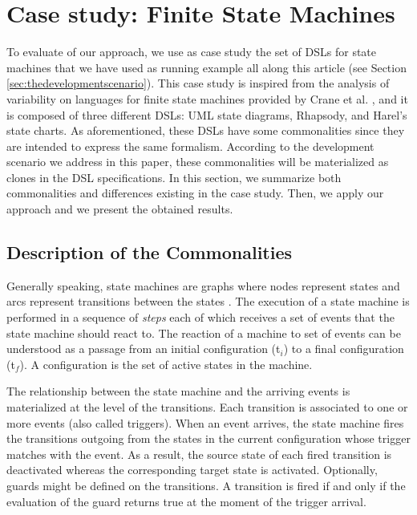 \section{Case study: Finite State Machines}
\label{sec:validation}

 To evaluate of our approach, we use as case study the set of DSLs for state machines that we have used as running example all along this article (see Section \ref{sec:thedevelopmentscenario}). This case study is inspired from the analysis of variability on languages for finite state machines provided by Crane et al. \cite{Crane:2007}, and it is composed of three different DSLs: UML state diagrams, Rhapsody, and Harel's state charts. As aforementioned, these DSLs have some commonalities since they are intended to express the same formalism. According to the development scenario we address in this paper, these commonalities will be materialized as clones in the DSL specifications. In this section, we summarize both commonalities and differences existing in the case study. Then, we apply our approach and we present the obtained results. 

\subsection{Description of the Commonalities}

Generally speaking, state machines are graphs where nodes represent states and arcs represent transitions between the states \cite{Harel:1987}. The execution of a state machine is performed in a sequence of \textit{steps} each of which receives a set of events that the state machine should react to. The reaction of a machine to set of events can be understood as a passage from an initial configuration (t$_i$) to a final configuration (t$_{f}$). A configuration is the set of active states in the machine. 

The relationship between the state machine and the arriving events is materialized at the level of the transitions. Each transition is associated to one or more events (also called triggers). When an event arrives, the state machine fires the transitions outgoing from the states in the current configuration whose trigger matches with the event. As a result, the source state of each fired transition is deactivated whereas the corresponding target state is activated. Optionally, guards might be defined on the transitions. A transition is fired if and only if the evaluation of the guard returns true at the moment of the trigger arrival. 

